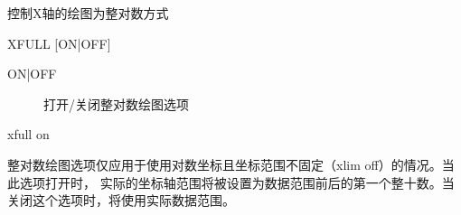 \label{cmd:xfull}

控制X轴的绘图为整对数方式

\begin{SACSTX}
XFULL [ON|OFF]
\end{SACSTX}

\begin{description}
\item [ON|OFF] 打开/关闭整对数绘图选项
\end{description}

\begin{SACDFT}
xfull on
\end{SACDFT}

整对数绘图选项仅应用于使用对数坐标且坐标范围不固定（xlim off）的情况。当此选项打开时，
实际的坐标轴范围将被设置为数据范围前后的第一个整十数。当关闭这个选项时，将使用实际数据范围。

